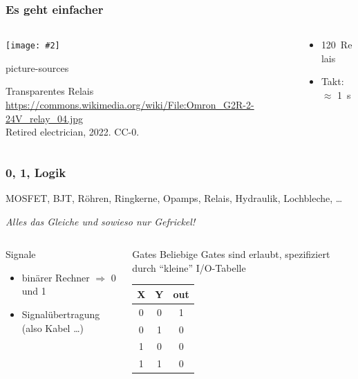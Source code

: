 \documentclass[t,aspectratio=169]{beamer}
\newcommand{\sourcedimage}[5][width=\textwidth,height=0.7\textheight,keepaspectratio]{%
  \begin{center}
    \texttt{[image: \#2]}

    \expandafter\begin{collect}{picture-sources}{}{}
      \item[#3] \href{#4}{#4} \\ #5
    \end{collect}
  \end{center}
}
\begin{document}
\begin{frame}
  \frametitle{Es geht einfacher}

  \begin{columns}
    \begin{column}{.45\textwidth}
      \sourcedimage{relay-transparent}{Transparentes Relais}{https://commons.wikimedia.org/wiki/File:Omron\_G2R-2-24V\_relay\_04.jpg}{Retired electrician, 2022. CC-0.}
    \end{column}
    \begin{column}{.45\textwidth}
      \begin{itemize}
      \item \qty{120} Relais
      \item Takt: $\approx$ \qty{1}{\second}
      \end{itemize}
    \end{column}
  \end{columns}
\end{frame}

\begin{frame}
  \frametitle{0, 1, Logik}

  \begin{center}
    MOSFET, BJT, Röhren, Ringkerne, Opamps, Relais, Hydraulik, Lochbleche, \ldots

    \textit{Alles das Gleiche und sowieso nur Gefrickel!}
  \end{center}

  \begin{columns}[t]
    \begin{column}{.45\textwidth}
      \begin{block}{Signale}
        \begin{itemize}
        \item binärer Rechner $\Rightarrow$ 0 und 1\\
           
        \item Signalübertragung (also Kabel \ldots)
        \end{itemize}
      \end{block}
    \end{column}
    \begin{column}{.45\textwidth}
      \begin{block}{Gates}
        Beliebige Gates sind erlaubt, spezifiziert durch \enquote{kleine} I/O-Tabelle

        \begin{center}
          \begin{tabular}{ccc}
            X & Y & out \\
            \midrule
            0 & 0 & 1 \\
            0 & 1 & 0 \\
            1 & 0 & 0 \\
            1 & 1 & 0 \\
          \end{tabular}
        \end{center}
      \end{block}
    \end{column}
  \end{columns}
\end{frame}
\end{document}
